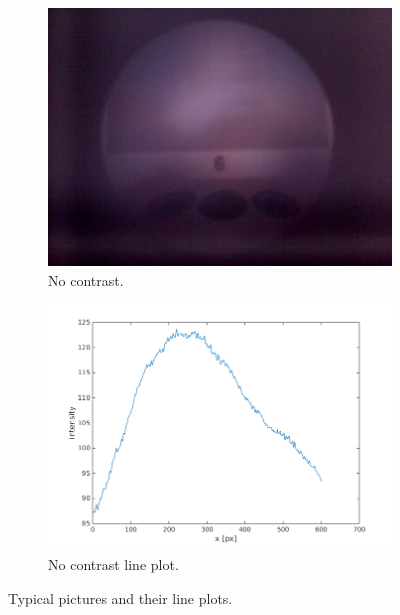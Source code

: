 \documentclass[a4paper, 12pt]{paper}
\begin{document}
\begin{figure}[H]
\begin{subfigure}[t]{0.40\textwidth}
        \includegraphics[width=\textwidth]{img/6}
        \caption{No contrast.}
    \end{subfigure}
    \begin{subfigure}[t]{0.45\textwidth}
        \includegraphics[width=\textwidth]{img/line_plot_6}
        \caption{No contrast line plot.}
    \end{subfigure}
    \caption{Typical pictures and their line plots.}
\label{fig:MTF}
\end{figure}
\end{document}
